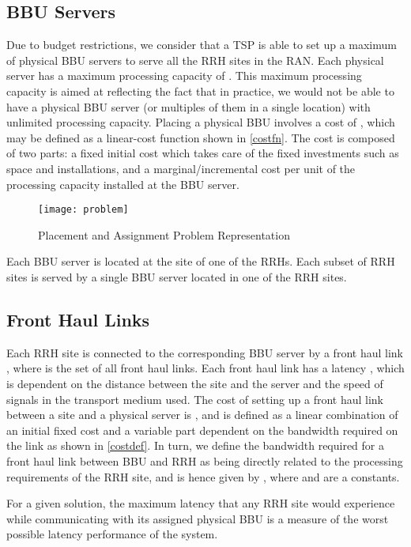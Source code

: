\documentclass[conference]{IEEEtran}
\begin{document}
\subsection{\ac{BBU} Servers}
Due to budget restrictions, we consider that a TSP is able to set up a maximum of  physical BBU servers to serve all the RRH sites in the RAN. Each physical server  has a maximum processing capacity of . This maximum processing capacity is aimed at reflecting the fact that in practice, we would not be able to have a physical \ac{BBU} server (or multiples of them in a single location) with unlimited processing capacity. Placing a physical BBU  involves a cost of , which may be defined as a linear-cost function shown in \eqref{costfn}. The cost is composed of two parts: a fixed initial cost  which takes care of the fixed investments such as space and installations, and a marginal/incremental cost  per unit of the processing capacity installed at the BBU server.

\begin{figure}[t]
\centering
{\texttt{[image: problem]}}
  \caption{Placement and Assignment Problem Representation}
  \label{problem}
\end{figure}


Each \ac{BBU} server is located at the site of one of the \acp{RRH}. Each subset  of RRH sites is served by a single BBU server  located in one of the \ac{RRH} sites.
\subsection{Front Haul Links}
Each \ac{RRH} site  is connected to the corresponding \ac{BBU} server  by a front haul link , where  is the set of all front haul links.
Each front haul link  has a latency , which is dependent on the distance  between the site  and the server  and the speed of signals in the transport medium used. The cost of setting up a front haul link between a site  and a physical server  is , and is defined as a linear combination of an initial fixed cost  and a variable part dependent on the bandwidth  required on the link as shown in \eqref{costdef}. In turn, we define the bandwidth  required for a front haul link between \ac{BBU}  and \ac{RRH}  as being directly related to the processing requirements  of the \ac{RRH} site, and is hence given by , where  and  are a constants.

For a given solution, the maximum latency that any RRH site would experience while communicating with its assigned physical \ac{BBU} is a measure of the worst possible latency performance of the system.
\end{document}
